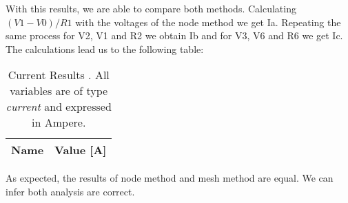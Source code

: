 With this results, we are able to compare both methods. Calculating $(V1-V0)/R1$ with the voltages of the node method we get Ia. Repeating the same process for V2, V1 and R2 we obtain Ib and for V3, V6 and R6 we get Ic. The calculations lead us to the following table:


\begin{table}[ht]
  \centering
  \begin{tabular}{|l|r|}
    \hline    
    {\bf Name} & {\bf Value [A]} \\ \hline
    
  \end{tabular}
  \caption{Current Results . All variables are of type {\em current}
    and expressed in Ampere.}
  \label{tab:validation}
\end{table}

As expected, the results of node method and mesh method are equal. We can infer both analysis are correct.

